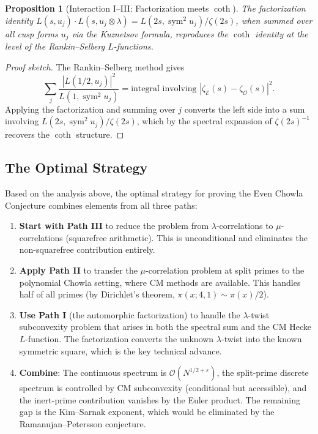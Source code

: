 \documentclass[11pt,a4paper]{article}
\theoremstyle{plain}
\newtheorem{proposition}[theorem]{Proposition}
\theoremstyle{definition}
\newcommand{\EE}{\mathcal{E}}
\newcommand{\OO}{\mathcal{O}}
\newcommand{\sym}{\operatorname{sym}}
\begin{document}
\begin{proposition}[Interaction I--III: Factorization meets $\coth$]
The factorization identity $L(s, u_j) \cdot L(s, u_j \otimes \lambda) = L(2s, \sym^2 u_j)/\zeta(2s)$, when summed over all cusp forms $u_j$ via the Kuznetsov formula, reproduces the $\coth$ identity at the level of the Rankin--Selberg $L$-functions.
\end{proposition}

\begin{proof}[Proof sketch]
The Rankin--Selberg method gives
\[
\sum_{j} \frac{|L(1/2, u_j)|^2}{L(1, \sym^2 u_j)} = \text{integral involving } |\zeta_{\EE}(s) - \zeta_{\OO}(s)|^2.
\]
Applying the factorization and summing over $j$ converts the left side into a sum involving $L(2s, \sym^2 u_j)/\zeta(2s)$, which by the spectral expansion of $\zeta(2s)^{-1}$ recovers the $\coth$ structure.
\end{proof}

\subsection{The Optimal Strategy}

Based on the analysis above, the optimal strategy for proving the Even Chowla Conjecture combines elements from all three paths:

\begin{enumerate}
\item \textbf{Start with Path III} to reduce the problem from $\lambda$-correlations to $\mu$-correlations (squarefree arithmetic). This is unconditional and eliminates the non-squarefree contribution entirely.

\item \textbf{Apply Path II} to transfer the $\mu$-correlation problem at split primes to the polynomial Chowla setting, where CM methods are available. This handles half of all primes (by Dirichlet's theorem, $\pi(x; 4, 1) \sim \pi(x)/2$).

\item \textbf{Use Path I} (the automorphic factorization) to handle the $\lambda$-twist subconvexity problem that arises in both the spectral sum and the CM Hecke $L$-function. The factorization converts the unknown $\lambda$-twist into the known symmetric square, which is the key technical advance.

\item \textbf{Combine}: The continuous spectrum is $\mathcal{O}(N^{1/2+\varepsilon})$, the split-prime discrete spectrum is controlled by CM subconvexity (conditional but accessible), and the inert-prime contribution vanishes by the Euler product. The remaining gap is the Kim--Sarnak exponent, which would be eliminated by the Ramanujan--Petersson conjecture.
\end{enumerate}
\end{document}
